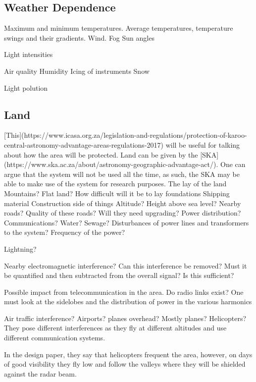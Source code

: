 \documentclass[11pt]{witseiepaper}
\begin{document}
\subsection{Weather Dependence} \label{sec:Weatherdependence}

Maximum and minimum temperatures. Average temperatures, temperature swings and their gradients.
Wind.
Fog
Sun angles

Light intensities

Air quality
Humidity
Icing of instruments
Snow


Light polution



\subsection{Land} \label{sec:Land}

[This](https://www.icasa.org.za/legislation-and-regulations/protection-of-karoo-central-astronomy-advantage-areas-regulations-2017) will be useful for talking about how the area will be protected.
Land can be given by the [SKA](https://www.ska.ac.za/about/astronomy-geographic-advantage-act/). One can argue that the system will not be used all the time, as such, the SKA may be able to make use of the system for research purposes.
The lay of the land
Mountains?
Flat land?
How difficult will it be to lay foundations
Shipping material
Construction side of things
Altitude? Height above sea level?
Nearby roads?
Quality of these roads? Will they need upgrading? 
Power distribution? 
Communications?
Water?
Sewage?
Disturbances of power lines and transformers to the system?
Frequency of the power?

Lightning?

Nearby electromagnetic interference?
Can this interference be removed? Must it be quantified and then subtracted from the overall signal? Is this sufficient?

Possible impact from telecommunication in the area. Do radio links exist? 
One must look at the sidelobes and the distribution of power in the various harmonics

Air traffic interference?
Airports? planes overhead?
Mostly planes? Helicopters? They pose different interferences as they fly at different altitudes and use different communication systems.

In the design paper, they say that helicopters frequent the area, however, on days of good visibility they fly low and follow the valleys where they will be shielded against the radar beam.
\end{document}

